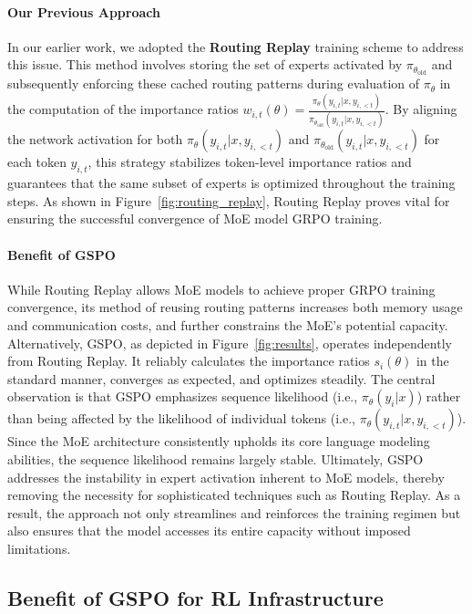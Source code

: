 \paragraph{Our Previous Approach} In our earlier work, we adopted the \textbf{Routing Replay} training scheme to address this issue. This method involves storing the set of experts activated by $\pi_{\theta_\text{old}}$ and subsequently enforcing these cached routing patterns during evaluation of $\pi_{\theta}$ in the computation of the importance ratios $w_{i,t}(\theta) = \frac{ \pi_{\theta} (y_{i,t} | x, y_{i,<t}) }{ \pi_{\theta_\text{old}} (y_{i,t} | x,y_{i,<t})}$. By aligning the network activation for both $\pi_{\theta} (y_{i,t} | x, y_{i,<t})$ and $\pi_{\theta_\text{old}} (y_{i,t} | x,y_{i,<t})$ for each token $y_{i,t}$, this strategy stabilizes token-level importance ratios and guarantees that the same subset of experts is optimized throughout the training steps. As shown in Figure~\ref{fig:routing_replay}, Routing Replay proves vital for ensuring the successful convergence of MoE model GRPO training.

\paragraph{Benefit of GSPO} While Routing Replay allows MoE models to achieve proper GRPO training convergence, its method of reusing routing patterns increases both memory usage and communication costs, and further constrains the MoE's potential capacity. Alternatively, GSPO, as depicted in Figure~\ref{fig:results}, operates independently from Routing Replay. It reliably calculates the importance ratios $s_i(\theta)$ in the standard manner, converges as expected, and optimizes steadily. The central observation is that GSPO emphasizes sequence likelihood (i.e., $\pi_{\theta} (y_i | x)$) rather than being affected by the likelihood of individual tokens (i.e., $\pi_{\theta} (y_{i,t} | x, y_{i,<t})$). Since the MoE architecture consistently upholds its core language modeling abilities, the sequence likelihood remains largely stable. Ultimately, GSPO addresses the instability in expert activation inherent to MoE models, thereby removing the necessity for sophisticated techniques such as Routing Replay. As a result, the approach not only streamlines and reinforces the training regimen but also ensures that the model accesses its entire capacity without imposed limitations.

\subsection{Benefit of GSPO for RL Infrastructure}

